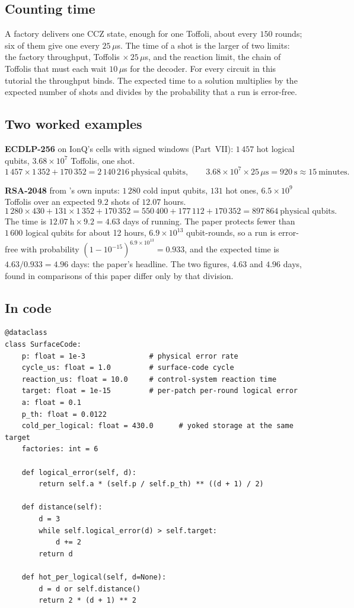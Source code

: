 \documentclass[11pt]{article}
\theoremstyle{plain}
\theoremstyle{remark}
\begin{document}
\subsection{Counting time}

A factory delivers one CCZ state, enough for one Toffoli, about every $150$ rounds; six of them give
one every $25\,\mu$s. The time of a shot is the larger of two limits: the factory throughput,
Toffolis $\times\,25\,\mu$s, and the reaction limit, the chain of Toffolis that must each wait
$10\,\mu$s for the decoder. For every circuit in this tutorial the throughput binds. The expected
time to a solution multiplies by the expected number of shots and divides by the probability that
a run is error-free.

\subsection{Two worked examples}

\textbf{ECDLP-256} on IonQ's cells with signed windows (Part~VII): $1\,457$ hot logical qubits,
$3.68\times10^7$ Toffolis, one shot.
\[ 1\,457\times1\,352+170\,352=2\,140\,216\ \text{physical qubits},\qquad
   3.68\times10^{7}\times25\,\mu\text{s}=920\ \text{s}\approx15\ \text{minutes}. \]

\textbf{RSA-2048} from \cite{ec:gidney25rsa}'s own inputs: $1\,280$ cold input qubits, $131$ hot
ones, $6.5\times10^9$ Toffolis over an expected $9.2$ shots of $12.07$ hours.
\[ 1\,280\times430+131\times1\,352+170\,352=550\,400+177\,112+170\,352=897\,864\ \text{physical qubits}. \]
The time is $12.07\ \text{h}\times9.2=4.63$ days of running. The paper protects fewer than
$1\,600$ logical qubits for about 12 hours, $6.9\times10^{13}$ qubit-rounds, so a run is
error-free with probability $(1-10^{-15})^{6.9\times10^{13}}=0.933$, and the expected time is
$4.63/0.933=4.96$ days: the paper's headline. The two figures, $4.63$ and $4.96$ days, found in
comparisons of this paper differ only by that division.

\subsection{In code}

\begin{lstlisting}
@dataclass
class SurfaceCode:
    p: float = 1e-3               # physical error rate
    cycle_us: float = 1.0         # surface-code cycle
    reaction_us: float = 10.0     # control-system reaction time
    target: float = 1e-15         # per-patch per-round logical error
    a: float = 0.1
    p_th: float = 0.0122
    cold_per_logical: float = 430.0      # yoked storage at the same target
    factories: int = 6

    def logical_error(self, d):
        return self.a * (self.p / self.p_th) ** ((d + 1) / 2)

    def distance(self):
        d = 3
        while self.logical_error(d) > self.target:
            d += 2
        return d

    def hot_per_logical(self, d=None):
        d = d or self.distance()
        return 2 * (d + 1) ** 2
\end{lstlisting}
\end{document}
